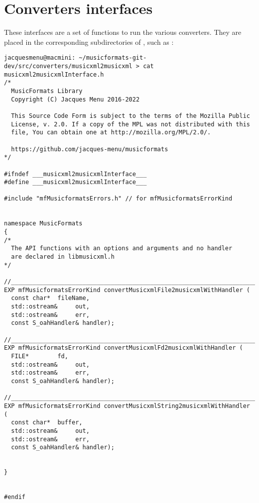 
\chapter{Converters interfaces}

These interfaces are a set of functions to run the various converters. They are placed in the corresponding subdirectories of \converters, such as :
\begin{lstlisting}[language=Terminal]
jacquesmenu@macmini: ~/musicformats-git-dev/src/converters/musicxml2musicxml > cat musicxml2musicxmlInterface.h
/*
  MusicFormats Library
  Copyright (C) Jacques Menu 2016-2022

  This Source Code Form is subject to the terms of the Mozilla Public
  License, v. 2.0. If a copy of the MPL was not distributed with this
  file, You can obtain one at http://mozilla.org/MPL/2.0/.

  https://github.com/jacques-menu/musicformats
*/

#ifndef ___musicxml2musicxmlInterface___
#define ___musicxml2musicxmlInterface___

#include "mfMusicformatsErrors.h" // for mfMusicformatsErrorKind


namespace MusicFormats
{
/*
  The API functions with an options and arguments and no handler
  are declared in libmusicxml.h
*/

//_______________________________________________________________________________
EXP mfMusicformatsErrorKind convertMusicxmlFile2musicxmlWithHandler (
  const char*  fileName,
  std::ostream&     out,
  std::ostream&     err,
  const S_oahHandler& handler);

//_______________________________________________________________________________
EXP mfMusicformatsErrorKind convertMusicxmlFd2musicxmlWithHandler (
  FILE*        fd,
  std::ostream&     out,
  std::ostream&     err,
  const S_oahHandler& handler);

//_______________________________________________________________________________
EXP mfMusicformatsErrorKind convertMusicxmlString2musicxmlWithHandler (
  const char*  buffer,
  std::ostream&     out,
  std::ostream&     err,
  const S_oahHandler& handler);


}


#endif
\end{lstlisting}


